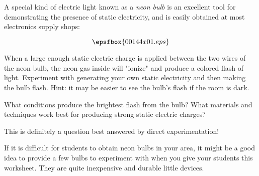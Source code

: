 

A special kind of electric light known as a {\it neon bulb} is an excellent tool for demonstrating the presence of static electricity, and is easily obtained at most electronics supply shops:

$$\epsfbox{00144x01.eps}$$

When a large enough static electric charge is applied between the two wires of the neon bulb, the neon gas inside will "ionize" and produce a colored flash of light.  Experiment with generating your own static electricity and then making the bulb flash.  Hint: it may be easier to see the bulb's flash if the room is dark.

What conditions produce the brightest flash from the bulb?  What materials and techniques work best for producing strong static electric charges?







This is definitely a question best answered by direct experimentation!







If it is difficult for students to obtain neon bulbs in your area, it might be a good idea to provide a few bulbs to experiment with when you give your students this worksheet.  They are quite inexpensive and durable little devices.





